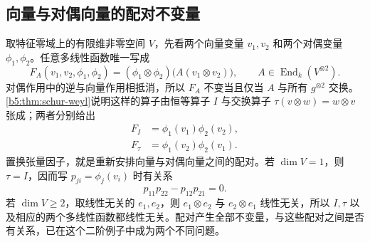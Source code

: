 \subsection{向量与对偶向量的配对不变量}
\label{b5:subsec:2205:03}

取特征零域上的有限维非零空间 \(V\)，先看两个向量变量 \(v_1,v_2\) 和两个对偶变量 \(\phi_1,\phi_2\)。任意多线性函数唯一写成
\[
	F_A(v_1,v_2,\phi_1,\phi_2) =(\phi_1\otimes\phi_2)\bigl(A(v_1\otimes v_2)\bigr), \qquad A\in\operatorname{End}_k(V^{\otimes2}).
\]
对偶作用中的逆与向量作用相抵消，所以 \(F_A\) 不变当且仅当 \(A\) 与所有 \(g^{\otimes2}\) 交换。\cref{b5:thm:schur-weyl}说明这样的算子由恒等算子 \(I\) 与交换算子 \(\tau(v\otimes w)=w\otimes v\) 张成；两者分别给出
\[
	\begin{aligned}
		F_I&=\phi_1(v_1)\phi_2(v_2),\\
		F_\tau&=\phi_1(v_2)\phi_2(v_1).
	\end{aligned}
\]
置换张量因子，就是重新安排向量与对偶向量之间的配对。若 \(\dim V=1\)，则 \(\tau=I\)，因而写 \(p_{ji}=\phi_j(v_i)\) 时有关系
\[
	p_{11}p_{22}-p_{12}p_{21}=0.
\]
若 \(\dim V\ge2\)，取线性无关的 \(e_1,e_2\)，则 \(e_1\otimes e_2\) 与 \(e_2\otimes e_1\) 线性无关，所以 \(I,\tau\) 以及相应的两个多线性函数都线性无关。配对产生全部不变量，与这些配对之间是否有关系，已在这个二阶例子中成为两个不同问题。

